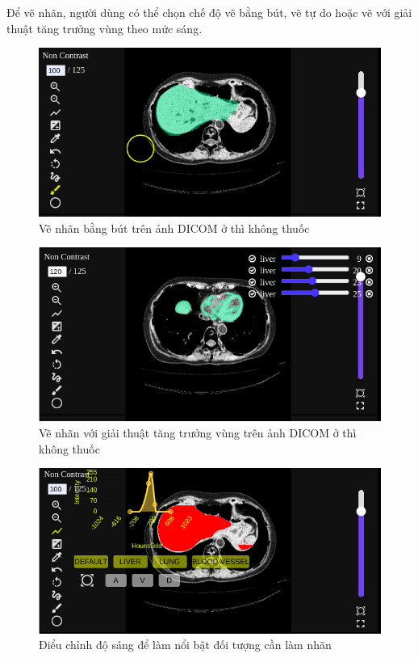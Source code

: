 Để vẽ nhãn, người dùng có thể chọn chế  độ vẽ bằng bút, vẽ tự do hoặc vẽ với giải thuật tăng trưởng vùng theo mức sáng.
\begin{figure}[H]
    \centering
    \includegraphics[width=\textwidth]{images/chapter-07-images/user-labeling-by-brush.png}
    \caption{Vẽ nhãn bằng bút trên ảnh DICOM ở thì không thuốc}
\end{figure}

\begin{figure}[H]
    \centering
    \includegraphics[width=\textwidth]{images/chapter-07-images/ui-labeling-region-growing.png}
    \caption{Vẽ nhãn với giải thuật tăng trưởng vùng trên ảnh DICOM ở thì không thuốc}
\end{figure}

\begin{figure}[H]
    \centering
    \includegraphics[width=\textwidth]{images/chapter-07-images/ui-adjust-contrast.png}
    \caption{Điểu chỉnh độ sáng để  làm nổi bật đối tượng cần làm nhãn}
\end{figure}

